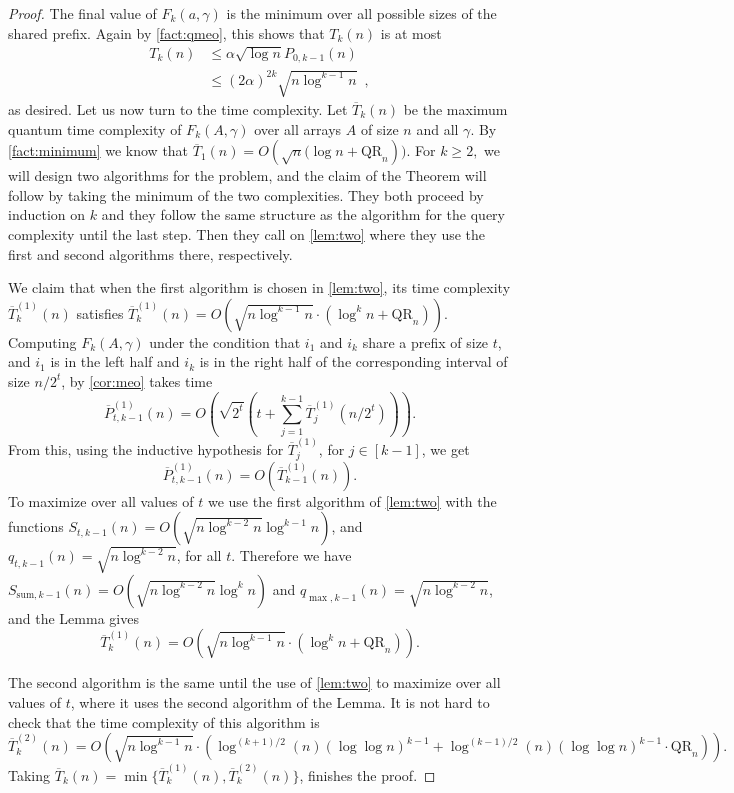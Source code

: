 \documentclass[12pt]{article}
\newcommand{\qr}{\mathrm{QR}}
\newcommand{\su}{\mathrm{sum}}
\theoremstyle{definition}
\begin{document}
\begin{proof}
The final value of $F_k(a, \gamma)$ is the minimum over all possible sizes of the shared prefix.  
Again by \cref{fact:qmeo}, this shows that $T_{k}(n)$ is at most
\begin{align*}
T_{k}(n) &\le \alpha \sqrt{\log n} P_{0, k-1}(n) \\
&\le (2\alpha)^{2k} \sqrt{n \log^{k-1} n} \enspace,
\end{align*}
as desired.
Let us now turn to the time complexity.
Let $\overline{T}_{k}(n)$ be the maximum quantum time complexity of $F_k(A,\gamma)$ over all arrays $A$ of size $n$ and all $\gamma$.
By \cref{fact:minimum} we know that $\overline{T}_{1}(n) ={O}({\sqrt{n} ( \log n + \qr_n})).$ For $k \geq 2,$ we will design two algorithms for the problem, and the claim of the Theorem will follow by taking the minimum of the two complexities.
They both proceed by induction on $k$ and they follow the same structure as the algorithm for the query complexity until the last step. Then they call on \cref{lem:two} where they use the first and second algorithms there, respectively.

We claim that when the first algorithm is chosen in \cref{lem:two}, its time complexity $\overline{T}^{(1)}_{k}(n)$ satisfies $\overline{T}_{k}^{(1)}(n) = O(\sqrt{n \log^{k-1} n} \cdot ( \log^k n +  \qr_n))$.
Computing $F_k(A,\gamma)$ under the condition that $i_1$ and $i_k$ share a prefix of size $t$, and $i_1$ is in the left half and $i_k$ is in the right half of the corresponding interval of size $n/2^t$, by \cref{cor:meo} takes time
\[
\overline{P}^{(1)}_{t,k-1} (n) 
= O \left(\sqrt{2^t} \left(t+ \sum_{j=1 }^{k-1} \overline{T}^{(1)}_{j}(n/2^t )\right) \right) . 
\]
From this, using the inductive hypothesis for $\overline{T}^{(1)}_{j}$, for $j \in [k-1]$, we get 
$$
\overline{P}^{(1)}_{t,k-1}(n)  = O(\overline{T}^{(1)}_{k-1}(n)).
$$
To maximize over all values of $t$ we use the first algorithm of \cref{lem:two} with the functions
$S_{t,k-1}(n) = O( \sqrt{n \log^{k-2} n}  \log^{k-1} n)$, and $q_{t,k-1}(n) =  \sqrt{n \log^{k-2} n} $, for all $t$.
Therefore we have $S_{\su,k-1}(n) = O( \sqrt{n \log^{k-2} n}  \log^{k} n)$ and $q_{\max,k-1}(n) =  \sqrt{n \log^{k-2} n} $,
and the Lemma gives
\[
\overline{T}_{k}^{(1)}(n) = O\left(\sqrt{n \log^{k-1} n} \cdot ( \log^k n +  \qr_n)\right).
\]

The second algorithm is the same until the use of \cref{lem:two} to maximize over all values of $t$, where it uses the second algorithm of the Lemma. It is not hard to check that the time complexity of this algorithm is
\[
\overline{T}_{k}^{(2)}(n) = O\left(\sqrt{n \log^{k-1} n} \cdot \left( \log^{(k+1)/2} (n) (\log \log n)^{k-1} + \log^{(k-1)/2} (n) (\log \log n)^{k-1} \cdot \qr_n \right)\right).
\]
Taking $\overline{T}_{k}(n) = \min \{\overline{T}_{k}^{(1)}(n) , \overline{T}_{k}^{(2)}(n) \}$,
finishes the proof.  
\end{proof}
\end{document}
